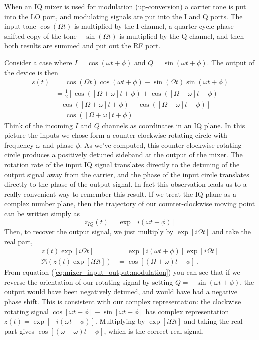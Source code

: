 
When an IQ mixer is used for modulation (up-conversion) a carrier tone is put into the LO port, and modulating signals are put into the I and Q ports. The input tone $\cos ( \Omega t)$ is multiplied by the I channel, a quarter cycle phase shifted copy of the tone $-\sin ( \Omega t)$ is multiplied by the Q channel, and then both results are summed and put out the RF port.

Consider a case where $I=\cos(\omega t + \phi)$ and $Q=\sin(\omega t + \phi)$. The output of the device is then
\begin{align}
s(t) &= \cos(\Omega t)\cos(\omega t + \phi) - \sin(\Omega t)\sin(\omega t + \phi) \nonumber \\
&= \frac{1}{2} \left[ \cos([\Omega + \omega]t + \phi) + \cos([\Omega-\omega]t - \phi) \right. \nonumber \\
&  \left. + \cos([\Omega+\omega]t + \phi) - \cos([\Omega-\omega]t-\phi) \right] \label{eq:mixer_input_output:modulation} \\
&= \cos([\Omega+\omega]t + \phi) \nonumber
\end{align}
Think of the incoming $I$ and $Q$ channels as coordinates in an IQ plane.
In this picture the inputs we chose form a counter-clockwise rotating circle with frequency $\omega$ and phase $\phi$.
As we've computed, this counter-clockwise rotating circle produces a positively detuned sideband at the output of the mixer.
The rotation rate of the input IQ signal translates directly to the detuning of the output signal away from the carrier, and the phase of the input circle translates directly to the phase of the output signal.
In fact this observation leads us to a really convenient way to remember this result.
If we treat the IQ plane as a complex number plane, then the trajectory of our counter-clockwise moving point can be written simply as \begin{equation}
z_{IQ}(t) = \exp[i(\omega t + \phi)] \label{eq:mixer_input_output:modulation_complex_rep} \end{equation}
Then, to recover the output signal, we just multiply by $\exp[i\Omega t]$ and take the real part,
\begin{align}
z(t)\exp[i\Omega t] &= \exp[i(\omega t + \phi)]\exp[i\Omega t] \nonumber \\
\Re \left( z(t)\exp[i\Omega t] \right ) &= \cos[(\Omega+\omega)t+\phi] \nonumber \, .
\end{align}
From equation (\ref{eq:mixer_input_output:modulation}) you can see that if we reverse the orientation of our rotating signal by setting $Q=-\sin(\omega t + \phi)$, the output would have been negatively detuned, and would have had a negative phase shift.
This is consistent with our complex representation: the clockwise rotating signal $\cos[\omega t + \phi] - \sin[\omega t + \phi]$ has complex representation $z(t) = \exp[-i(\omega t + \phi)]$.
Multiplying by $\exp[i\Omega t]$ and taking the real part gives $\cos[(\omega-\omega)t - \phi]$, which is the correct real signal.

